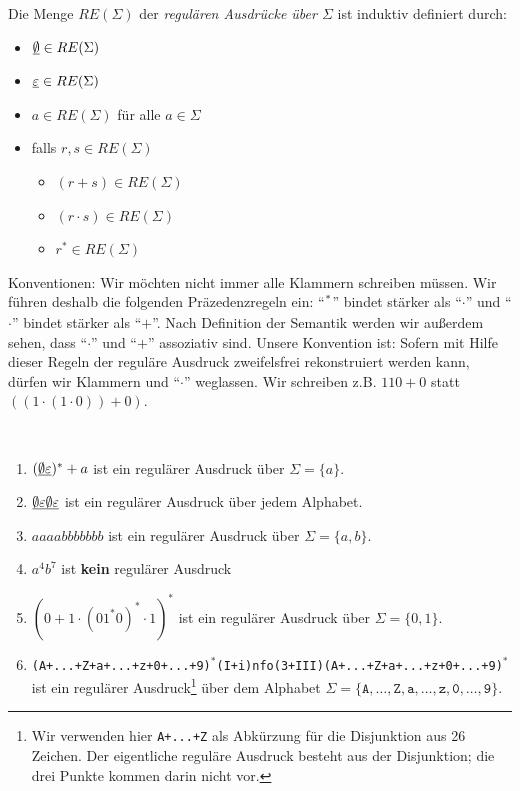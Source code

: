 \begin{Def}[name={[RE($\Sigma$)]}]
        Die Menge $RE(\Sigma)$ der \emph{regulären Ausdrücke über $\Sigma$} ist induktiv definiert durch:
        \begin{itemize}
        \item $\underline{\smash{\emptyset}}\in RE(\Sigma)$
        \item $\underline{\smash{\varepsilon}}\in RE(\Sigma)$
        \item $a\in RE(\Sigma)$ für alle $a\in\Sigma$
        \item falls $r,s\in RE(\Sigma)$
                \begin{itemize}[label=\textbullet]
                \item $(r+s)\in RE(\Sigma)$
                \item $(r\cdot s)\in RE(\Sigma)$
                \item $r^*\in RE(\Sigma)$
                \qedhere
                \end{itemize}
        \end{itemize}
\end{Def}
Konventionen: Wir möchten nicht immer alle Klammern schreiben müssen. 
Wir führen deshalb die folgenden Präzedenzregeln ein: "`$\strut^*$"' bindet stärker als "`$\cdot$"' und "`$\cdot$"' bindet stärker als "`$+$"'.
Nach Definition der Semantik werden wir außerdem sehen, dass "`$\cdot$"' und "`$+$"' assoziativ sind. 
Unsere Konvention ist: 
Sofern mit Hilfe dieser Regeln der reguläre Ausdruck zweifelsfrei rekonstruiert werden kann, dürfen wir Klammern und "`$\cdot$"' weglassen.
Wir schreiben z.B. $110 + 0$ statt $((1\cdot (1\cdot 0)) + 0)$.

\begin{Bsp}~
\begin{enumerate}
 \item $(\underline{\smash{\emptyset}}\underline{\smash{\varepsilon}})^*+a$ ist ein regulärer Ausdruck über $\Sigma=\{a\}$.
 \item $\underline{\smash{\emptyset}}\underline{\smash{\varepsilon}}\underline{\smash{\emptyset}}\underline{\smash{\varepsilon}}$ ist ein regulärer Ausdruck über jedem Alphabet.
 \item $aaaabbbbbbb$ ist ein regulärer Ausdruck über $\Sigma=\{a,b\}$.
 \item $a^4b^7$ ist \textbf{kein} regulärer Ausdruck
 \item $(0+1\cdot (01^*0)^*\cdot 1)^*$ ist ein regulärer Ausdruck über $\Sigma=\{0,1\}$.
 \item \texttt{(A+...+Z+a+...+z+0+...+9)}$^*$\texttt{(I+i)nfo(3+III)(A+...+Z+a+...+z+0+...+9)}$^*$ \linebreak
 ist ein regulärer Ausdruck\footnote{Wir verwenden hier \texttt{A+...+Z} als Abkürzung für die Disjunktion aus 26 Zeichen. 
 Der eigentliche reguläre Ausdruck besteht aus der Disjunktion; die drei Punkte kommen darin nicht vor.}
 über dem Alphabet $\Sigma=\{\texttt{A},\ldots,\texttt{Z},\texttt{a},\ldots,\texttt{z},\texttt{0},\ldots,\texttt{9}\}$.
 \qedhere
\end{enumerate}
\end{Bsp}

